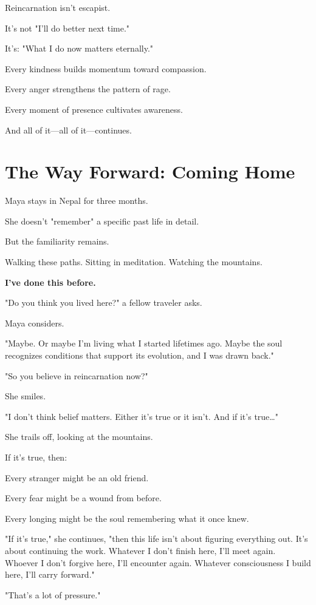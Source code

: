 \documentclass[11pt,twoside]{book}
\begin{document}
Reincarnation isn't escapist.

It's not "I'll do better next time."

It's: "What I do now matters eternally."

Every kindness builds momentum toward compassion.

Every anger strengthens the pattern of rage.

Every moment of presence cultivates awareness.

And all of it—all of it—continues.

\section*{The Way Forward: Coming Home}

Maya stays in Nepal for three months.

She doesn't "remember" a specific past life in detail.

But the familiarity remains.

Walking these paths. Sitting in meditation. Watching the mountains.

\textbf{I've done this before.}

"Do you think you lived here?" a fellow traveler asks.

Maya considers.

"Maybe. Or maybe I'm living what I started lifetimes ago. Maybe the soul recognizes conditions that support its evolution, and I was drawn back."

"So you believe in reincarnation now?"

She smiles.

"I don't think belief matters. Either it's true or it isn't. And if it's true\ldots{}"

She trails off, looking at the mountains.

If it's true, then:

Every stranger might be an old friend.

Every fear might be a wound from before.

Every longing might be the soul remembering what it once knew.

"If it's true," she continues, "then this life isn't about figuring everything out. It's about continuing the work. Whatever I don't finish here, I'll meet again. Whoever I don't forgive here, I'll encounter again. Whatever consciousness I build here, I'll carry forward."

"That's a lot of pressure."
\end{document}
